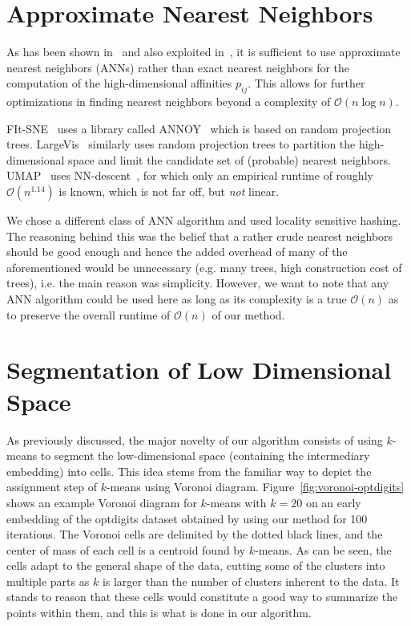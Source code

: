 \section{Approximate Nearest Neighbors}

As has been shown in~\cite{fitsne} and also exploited
in~\cite{largevis}, it is sufficient to use approximate nearest
neighbors (ANNs) rather than exact nearest neighbors for the computation
of the high-dimensional affinities $p_{ij}$. This allows for further
optimizations in finding nearest neighbors beyond a complexity
of $\mathcal{O}(n \log n)$.

FIt-SNE~\cite{fitsne} uses a library called ANNOY~\cite{annoy} which is based on random
projection trees. LargeVis~\cite{largevis} similarly uses random projection
trees to partition the high-dimensional space and limit the candidate set of
(probable) nearest neighbors. UMAP~\cite{umap} uses
NN-descent~\cite{nn_descent}, for which only an empirical runtime of roughly
$\mathcal{O}(n^{1.14})$ is known, which is not far off, but \emph{not} linear.

We chose a different class of ANN algorithm and used locality sensitive
hashing. The reasoning behind this was the belief that a rather crude nearest
neighbors should be good enough and hence the added overhead of many of the
aforementioned would be unnecessary (e.g. many trees, high construction cost of
trees), i.e. the main reason was simplicity. However, we want to note that any
ANN algorithm could be used here as long as its complexity is a true
$\mathcal{O}(n)$ as to preserve the overall runtime of $\mathcal{O}(n)$ of
our method.

\section{Segmentation of Low Dimensional Space}

As previously discussed, the major novelty of our algorithm consists of using
$k$-means to segment the low-dimensional space (containing the intermediary
embedding) into cells. This idea stems from the familiar way to depict the
assignment step of $k$-means using Voronoi diagram.
Figure~\ref{fig:voronoi-optdigits} shows an example Voronoi diagram for
$k$-means with $k = 20$ on an early embedding of the optdigits dataset obtained
by using our method for 100 iterations. The Voronoi cells are delimited by the
dotted black lines, and the center of mass of each cell is a centroid found by
$k$-means. As can be seen, the cells adapt to the general shape of the data,
cutting some of the clusters into multiple parts as $k$ is larger than the
number of clusters inherent to the data. It stands to reason that these cells
would constitute a good way to summarize the points within them, and this is
what is done in our algorithm.

